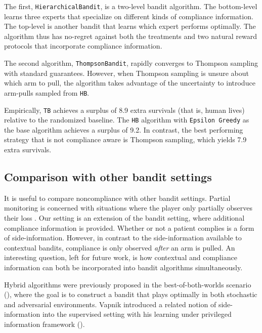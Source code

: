 The first, \texttt{HierarchicalBandit}, is a two-level bandit algorithm. The bottom-level learns three experts that specialize on different kinds of compliance information. The top-level is another bandit that learns which expert performs optimally. The algorithm thus has no-regret against both the treatments and two natural reward protocols that incorporate compliance information.

The second algorithm, \texttt{ThompsonBandit}, rapidly converges to Thompson sampling with standard guarantees. However, when Thompson sampling is unsure about which arm to pull, the algorithm takes advantage of the uncertainty to introduce arm-pulls sampled from \texttt{HB}.

Empirically, \texttt{TB} achieves a surplus of 8.9 extra survivals (that is, human lives) relative to the randomized baseline.
The \texttt{HB} algorithm with \texttt{Epsilon Greedy} as the base algorithm achieves a surplus of 9.2.
In contrast, the best performing strategy that is not compliance aware is Thompson sampling, which yields 7.9 extra survivals.



\subsection{Comparison with other bandit settings}
It is useful to compare noncompliance with other bandit settings. Partial monitoring is concerned with situations where the player only partially observes their loss \cite{alon:15}. Our setting is an extension of the bandit setting, where additional compliance information is provided. Whether or not a patient complies is a form of side-information. However, in contrast to the side-information available to contextual bandits, compliance is only observed \emph{after} an arm is pulled. An interesting question, left for future work, is how contextual and compliance information can both be incorporated into bandit algorithms simultaneously.

Hybrid algorithms were previously proposed in the best-of-both-worlds scenario (\cite{bubeck:12a,seldin:14}), where the goal is to construct a bandit that plays optimally in both stochastic and adversarial environments. Vapnik introduced a related notion of side-information into the supervised setting with his learning under privileged information framework (\cite{vapnik:09}). 

